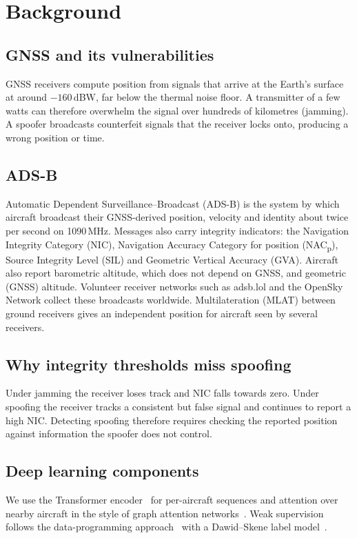 \documentclass[12pt,a4paper,oneside]{report}
\begin{document}
\chapter{Background}
\section{GNSS and its vulnerabilities}
GNSS receivers compute position from signals that arrive at the Earth's surface at around $-160$\,dBW, far below the
thermal noise floor. A transmitter of a few watts can therefore overwhelm the signal over hundreds of kilometres
(jamming). A spoofer broadcasts counterfeit signals that the receiver locks onto, producing a wrong position or time.
\section{ADS-B}
Automatic Dependent Surveillance--Broadcast (ADS-B) is the system by which aircraft broadcast their GNSS-derived position,
velocity and identity about twice per second on 1090\,MHz. Messages also carry integrity indicators: the Navigation Integrity
Category (NIC), Navigation Accuracy Category for position (NAC\textsubscript{p}), Source Integrity Level (SIL) and Geometric
Vertical Accuracy (GVA). Aircraft also report barometric altitude, which does not depend on GNSS, and geometric (GNSS)
altitude. Volunteer receiver networks such as adsb.lol and the OpenSky Network collect these broadcasts worldwide.
Multilateration (MLAT) between ground receivers gives an independent position for aircraft seen by several receivers.
\section{Why integrity thresholds miss spoofing}
Under jamming the receiver loses track and NIC falls towards zero. Under spoofing the receiver tracks a consistent but false
signal and continues to report a high NIC. Detecting spoofing therefore requires checking the reported position against
information the spoofer does not control.
\section{Deep learning components}
We use the Transformer encoder~\cite{vaswani2017attention} for per-aircraft sequences and attention over nearby aircraft
in the style of graph attention networks~\cite{brody2022gatv2}. Weak supervision follows the data-programming
approach~\cite{ratner2017snorkel} with a Dawid--Skene label model~\cite{dawid1979}.
\end{document}
